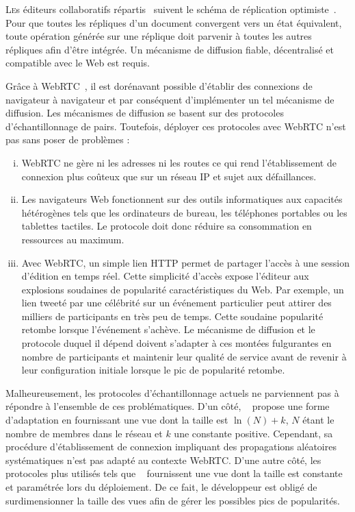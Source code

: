 

\lettrine{L}es éditeurs collaboratifs répartis~\cite{ellis1991groupware} suivent
le schéma de réplication optimiste~\cite{demers1987epidemic,
  johnson1975maintenance, ladin1992providing, saito2005optimistic}. Pour que
toutes les répliques d'un document convergent vers un état équivalent, toute
opération générée sur une réplique doit parvenir à toutes les autres répliques
afin d'être intégrée. Un mécanisme de diffusion fiable, décentralisé et
compatible avec le Web est requis.

Grâce à WebRTC~\cite{webrtc}, il est dorénavant possible d'établir des
connexions de navigateur à navigateur et par conséquent d'implémenter un tel
mécanisme de diffusion.
Les mécanismes de diffusion se basent sur des protocoles d'échantillonnage de
pairs. Toutefois, déployer ces protocoles avec WebRTC n'est pas sans poser de
problèmes :
\begin{enumerate}[(i)]
\item WebRTC ne gère ni les adresses ni les routes ce qui rend l'établissement
  de connexion plus coûteux que sur un réseau IP et sujet aux défaillances.
\item Les navigateurs Web fonctionnent sur des outils informatiques aux
  capacités hétérogènes tels que les ordinateurs de bureau, les téléphones
  portables ou les tablettes tactiles. Le protocole doit donc réduire sa
  consommation en ressources au maximum.
\item Avec WebRTC, un simple lien HTTP %
  permet de partager l'accès à une session d'édition en temps réel. Cette
  simplicité d'accès expose l'éditeur aux explosions soudaines de popularité
  caractéristiques du Web.  Par exemple, un lien \og tweeté \fg par une
  célébrité sur un événement particulier peut attirer des milliers de
  participants en très peu de temps. Cette soudaine popularité retombe lorsque
  l'événement s'achève.  Le mécanisme de diffusion et le protocole duquel il
  dépend doivent s'adapter à ces montées fulgurantes en nombre de participants et
  maintenir leur qualité de service avant de revenir à leur configuration
  initiale lorsque le pic de popularité retombe.
\end{enumerate}


Malheureusement, les protocoles d'échantillonnage actuels ne parviennent pas à
répondre à l'ensemble de ces problématiques. D'un côté,
\SCAMP~\cite{ganesh2001scamp, ganesh2003peer} propose une forme d'adaptation en
fournissant une vue dont la taille est $\ln (N) + k$, $N$ étant le nombre de
membres dans le réseau et $k$ une constante positive. Cependant, sa procédure
d'établissement de connexion impliquant des propagations aléatoires
systématiques n'est pas adapté au contexte WebRTC. D'une autre côté, les
protocoles plus utilisés tels que \CYCLON~\cite{voulgaris2005cyclon} fournissent
une vue dont la taille est constante et paramétrée lors du déploiement. De ce
fait, le développeur est obligé de surdimensionner la taille des vues afin de
gérer les possibles pics de popularités.



